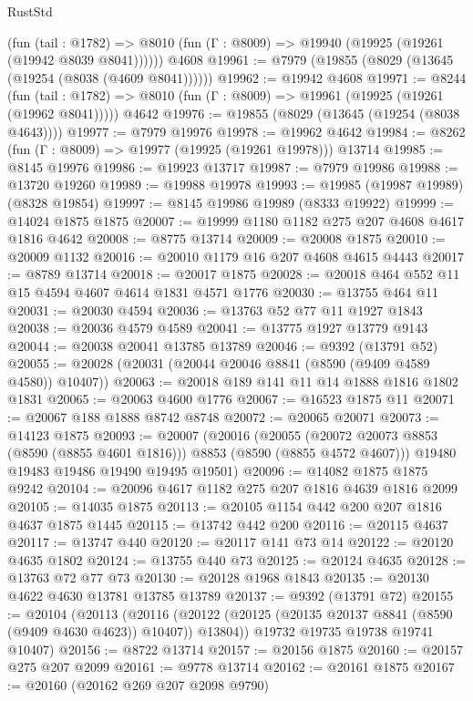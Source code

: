 \begin{lexlean}{RustStd}
\begin{coremodule}
      (fun (tail : @1782) =>
      @8010 (fun (Γ : @8009) => @19940 (@19925 (@19261 (@19942 @8039 @8041))))))
    @4608
@19961 := @7979 (@19855 (@8029 (@13645 (@19254 (@8038 (@4609 @8041))))))
@19962 := @19942 @4608
@19971 := @8244
    (fun (tail : @1782) => @8010 (fun (Γ : @8009) => @19961 (@19925 (@19261 (@19962 @8041)))))
    @4642
@19976 := @19855 (@8029 (@13645 (@19254 (@8038 @4643))))
@19977 := @7979 @19976
@19978 := @19962 @4642
@19984 := @8262 (fun (Γ : @8009) => @19977 (@19925 (@19261 @19978))) @13714
@19985 := @8145 @19976
@19986 := @19923 @13717
@19987 := @7979 @19986
@19988 := @13720 @19260
@19989 := @19988 @19978
@19993 := @19985 (@19987 @19989) (@8328 @19854)
@19997 := @8145 @19986 @19989 (@8333 @19922)
@19999 := @14024 @1875 @1875
@20007 := @19999 @1180 @1182 @275 @207 @4608 @4617 @1816 @4642
@20008 := @8775 @13714
@20009 := @20008 @1875
@20010 := @20009 @1132
@20016 := @20010 @1179 @16 @207 @4608 @4615 @4443
@20017 := @8789 @13714
@20018 := @20017 @1875
@20028 := @20018 @464 @552 @11 @15 @4594 @4607 @4614 @1831 @4571 @1776
@20030 := @13755 @464 @11
@20031 := @20030 @4594
@20036 := @13763 @52 @77 @11 @1927 @1843
@20038 := @20036 @4579 @4589
@20041 := @13775 @1927 @13779 @9143
@20044 := @20038 @20041 @13785 @13789
@20046 := @9392 (@13791 @52)
@20055 := @20028 (@20031 (@20044 @20046 @8841 (@8590 (@9409 @4589 @4580)) @10407))
@20063 := @20018 @189 @141 @11 @14 @1888 @1816 @1802 @1831
@20065 := @20063 @4600 @1776
@20067 := @16523 @1875 @11
@20071 := @20067 @188 @1888 @8742 @8748
@20072 := @20065 @20071
@20073 := @14123 @1875
@20093 := @20007
    (@20016
      (@20055 (@20072 @20073 @8853 (@8590 (@8855 @4601 @1816))) @8853 (@8590 (@8855 @4572 @4607)))
      @19480
      @19483
      @19486
      @19490
      @19495
      @19501)
@20096 := @14082 @1875 @1875 @9242
@20104 := @20096 @4617 @1182 @275 @207 @1816 @4639 @1816 @2099
@20105 := @14035 @1875
@20113 := @20105 @1154 @442 @200 @207 @1816 @4637 @1875 @1445
@20115 := @13742 @442 @200
@20116 := @20115 @4637
@20117 := @13747 @440
@20120 := @20117 @141 @73 @14
@20122 := @20120 @4635 @1802
@20124 := @13755 @440 @73
@20125 := @20124 @4635
@20128 := @13763 @72 @77 @73
@20130 := @20128 @1968 @1843
@20135 := @20130 @4622 @4630 @13781 @13785 @13789
@20137 := @9392 (@13791 @72)
@20155 := @20104
    (@20113
      (@20116 (@20122 (@20125 (@20135 @20137 @8841 (@8590 (@9409 @4630 @4623)) @10407)) @13804))
      @19732
      @19735
      @19738
      @19741
      @10407)
@20156 := @8722 @13714
@20157 := @20156 @1875
@20160 := @20157 @275 @207 @2099
@20161 := @9778 @13714
@20162 := @20161 @1875
@20167 := @20160 (@20162 @269 @207 @2098 @9790)

\end{coremodule}
\end{lexlean}
